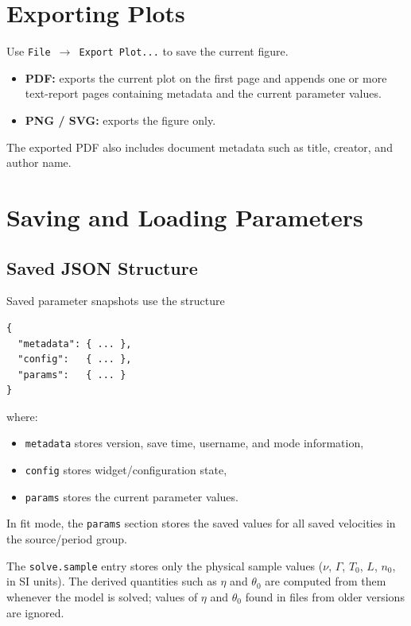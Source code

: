 \documentclass[12pt,a4paper]{article}
\newcommand{\menu}[1]{\texttt{#1}}
\begin{document}
\section{Exporting Plots}

Use \menu{File $\to$ Export Plot...} to save the current figure.

\begin{itemize}[noitemsep]
  \item \textbf{PDF:} exports the current plot on the first page and appends one or more text-report pages
  containing metadata and the current parameter values.
  \item \textbf{PNG / SVG:} exports the figure only.
\end{itemize}

The exported PDF also includes document metadata such as title, creator, and author name.

\section{Saving and Loading Parameters}

\subsection{Saved JSON Structure}\label{sec:json}

Saved parameter snapshots use the structure
\begin{verbatim}
{
  "metadata": { ... },
  "config":   { ... },
  "params":   { ... }
}
\end{verbatim}
where:
\begin{itemize}[noitemsep]
  \item \texttt{metadata} stores version, save time, username, and mode information,
  \item \texttt{config} stores widget/configuration state,
  \item \texttt{params} stores the current parameter values.
\end{itemize}

In fit mode, the \texttt{params} section stores the saved values for all saved velocities in the source/period group.

The \texttt{solve.sample} entry stores only the physical sample values
($\nu$, $\Gamma$, $T_0$, $L$, $n_0$, in SI units). The derived quantities such as
$\eta$ and $\theta_0$ are computed from them whenever the model is solved; values
of $\eta$ and $\theta_0$ found in files from older versions are ignored.
\end{document}
